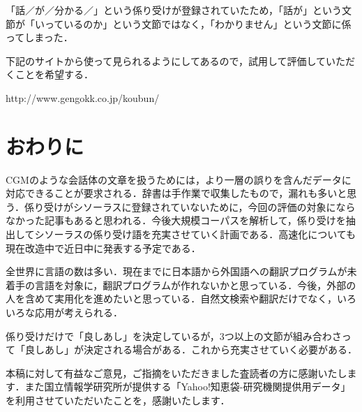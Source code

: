 \documentclass[japanese]{jnlp_1.4}
\begin{document}
「話／が／分かる／」という係り受けが登録されていたため，「話が」という文節が「いっているのか」という文節ではなく，「わかりません」という文節に係ってしまった．

下記のサイトから使って見られるようにしてあるので，試用して評価していただくことを希望する．

http://www.gengokk.co.jp/koubun/



\section{おわりに}

CGMのような会話体の文章を扱うためには，より一層の誤りを含んだデータに対応できることが要求される．辞書は手作業で収集したもので，漏れも多いと思う．係り受けがシソーラスに登録されていないために，今回の評価の対象にならなかった記事もあると思われる．今後大規模コーパスを解析して，係り受けを抽出してシソーラスの係り受け語を充実させていく計画である．高速化についても現在改造中で近日中に発表する予定である．

全世界に言語の数は多い．現在までに日本語から外国語への翻訳プログラムが未着手の言語を対象に，翻訳プログラムが作れないかと思っている．今後，外部の人を含めて実用化を進めたいと思っている．自然文検索や翻訳だけでなく，いろいろな応用が考えられる．

係り受けだけで「良しあし」を決定しているが，3つ以上の文節が組み合わさって「良しあし」が決定される場合がある．これから充実させていく必要がある．

\acknowledgment

本稿に対して有益なご意見，ご指摘をいただきました査読者の方に感謝いたします．また国立情報学研究所が提供する「Yahoo!知恵袋-研究機関提供用データ」を利用させていただいたことを，感謝いたします．
\end{document}
